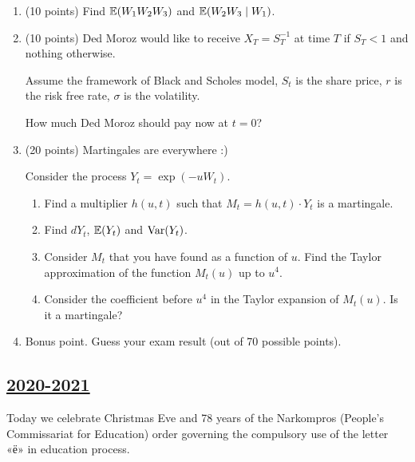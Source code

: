 \begin{enumerate}
  \item (10 points) Find $\operatorname{\mathbb{E}}(W_1 W_2 W_3)$ and $\operatorname{\mathbb{E}}(W_2 W_3 \mid W_1)$.
  \item (10 points) Ded Moroz would like to receive $X_T = S^{-1}_T$ at time $T$ if $S_T < 1$ and nothing otherwise.
      
  Assume the framework of Black and Scholes model, $S_t$ is the share price, $r$ is the risk free rate,
  $\sigma$ is the volatility. 
  
  How much Ded Moroz should pay now at $t=0$?
  
  
  \item (20 points) Martingales are everywhere :)
  
  Consider the process $Y_t = \exp( - u W_t)$. 
  
  \begin{enumerate}
    \item Find a multiplier $h(u, t)$ such that $M_t = h(u, t) \cdot Y_t$ is a martingale. 
    \item Find $dY_t$, $\operatorname{\mathbb{E}}(Y_t)$ and $\operatorname{Var}(Y_t)$.
    \item Consider $M_t$ that you have found as a function of $u$. 
    Find the Taylor approximation of the function $M_t(u)$ up to $u^4$. 
    \item Consider the coefficient before $u^4$ in the Taylor expansion of $M_t(u)$. 
    Is it a martingale?
  \end{enumerate}
  
  \item Bonus point. Guess your exam result (out of 70 possible points). 
  
  \end{enumerate}
  
      

\subsection[2020-2021]{\hyperref[sec:sol_kr_02_2020_2021]{2020-2021}}
\label{sec:kr_02_2020_2021} %



Today we celebrate Christmas Eve and 78 years of the Narkompros (People's Commissariat for Education) order governing the compulsory use of the letter «ё» in education process.


